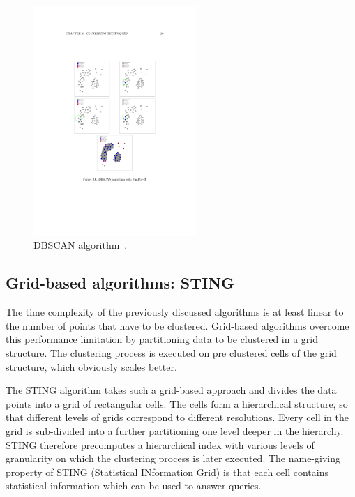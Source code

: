 \begin{figure}[h]
  \begin{center}
    \includegraphics[width=0.55\textwidth]{figures/clustering_dbscan.pdf}
    \caption{DBSCAN algorithm~\cite[p 26]{Meert06clustermaps}.}
    \label{fig:clustering-dbscan}
  \end{center}
\end{figure}

\subsection{Grid-based algorithms: STING}
\label{chapter:clustering-grid}

The time complexity of the previously discussed algorithms is at least linear to the number of points that have to be clustered. Grid-based algorithms overcome this performance limitation by partitioning data to be clustered in a grid structure. The clustering process is executed on pre clustered cells of the grid structure, which obviously scales better.

The STING algorithm takes such a grid-based approach and divides the data points into a grid of rectangular cells. The cells form a hierarchical structure, so that different levels of grids correspond to different resolutions. Every cell in the grid is sub-divided into a further partitioning one level deeper in the hierarchy. STING therefore precomputes a hierarchical index with various levels of granularity on which the clustering process is later executed. The name-giving property of STING (Statistical INformation Grid) is that each cell contains statistical information which can be used to answer queries. 

